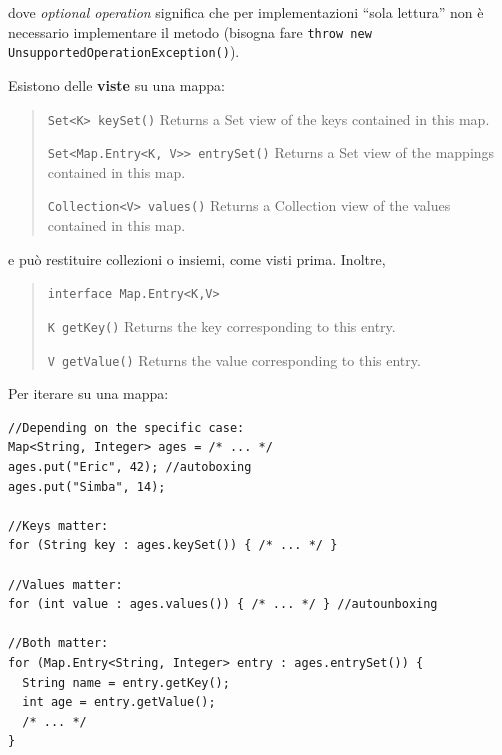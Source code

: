 \documentclass[\fontsizeclass,twocolumn]{\classname}
\theoremstyle{definition}
\theoremstyle{definition}
\begin{document}
dove \emph{optional operation} significa che per implementazioni ``sola
lettura'' non è necessario implementare il metodo (bisogna fare \texttt{throw
new UnsupportedOperationException()}).

Esistono delle \textbf{viste} su una mappa:
\begin{quote}
    \footnotesize{\texttt{Set<K> 	keySet()} 	Returns a Set view of the keys contained in this map.

\texttt{Set<Map.Entry<K, V>> 	entrySet()} 	Returns a Set view of the mappings contained in this map.

\texttt{Collection<V> 	values()} 	Returns a Collection view of the values contained in this map.}
\end{quote}

e può restituire collezioni o insiemi, come visti prima. Inoltre,
\begin{quote}
    \footnotesize{\texttt{interface Map.Entry<K,V>}

        \texttt{K 	getKey()} 	Returns the key corresponding to this entry.

    \texttt{V 	getValue()} 	Returns the value corresponding to this entry.}
\end{quote}

Per iterare su una mappa:


\begin{lstlisting}
//Depending on the specific case:
Map<String, Integer> ages = /* ... */
ages.put("Eric", 42); //autoboxing
ages.put("Simba", 14);

//Keys matter:
for (String key : ages.keySet()) { /* ... */ }

//Values matter:
for (int value : ages.values()) { /* ... */ } //autounboxing

//Both matter:
for (Map.Entry<String, Integer> entry : ages.entrySet()) {
  String name = entry.getKey();
  int age = entry.getValue();
  /* ... */
}
\end{lstlisting}
\end{document}
